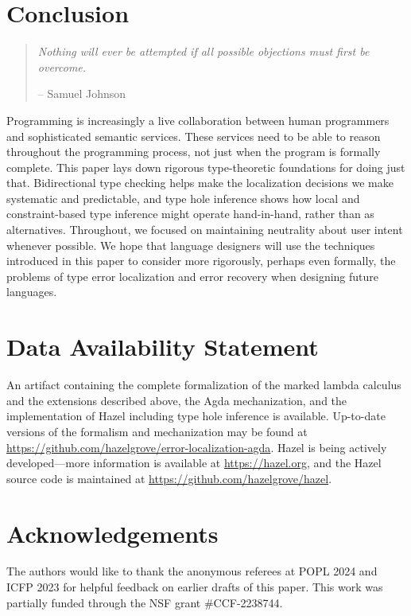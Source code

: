 \section{Conclusion}
\label{sec:conclusion}

\begin{quote}
    \emph{Nothing will ever be attempted if all possible objections must first be overcome.} 
    \begin{flushright}-- Samuel Johnson\end{flushright}
\end{quote}

Programming is increasingly a live collaboration between human programmers and sophisticated semantic services. These services need to be able to reason throughout the programming process, not just when the program is formally complete. This paper lays down rigorous type-theoretic foundations for doing just that. Bidirectional type checking helps make the localization decisions we make systematic and predictable, and type hole inference shows how local and constraint-based type inference might operate hand-in-hand, rather than as alternatives. Throughout, we focused on maintaining neutrality about user intent whenever possible. 
We hope that language designers will use the techniques introduced in this paper to consider more rigorously, perhaps even formally, the problems of type error localization and error recovery when designing future languages. 

\section*{Data Availability Statement}
An artifact \cite{zhao2023} containing the complete formalization of the marked lambda calculus and the extensions described above, the Agda mechanization, and the implementation of Hazel including type hole inference is available.
Up-to-date versions of the formalism and mechanization may be found at \url{https://github.com/hazelgrove/error-localization-agda}.
Hazel is being actively developed---more information is available at \url{https://hazel.org}, and the Hazel source code is maintained at \url{https://github.com/hazelgrove/hazel}.

\section*{Acknowledgements}
The authors would like to thank the anonymous referees at POPL 2024 and ICFP 2023 for helpful feedback on earlier drafts of this paper.
This work was partially funded through the NSF grant \#CCF-2238744.

